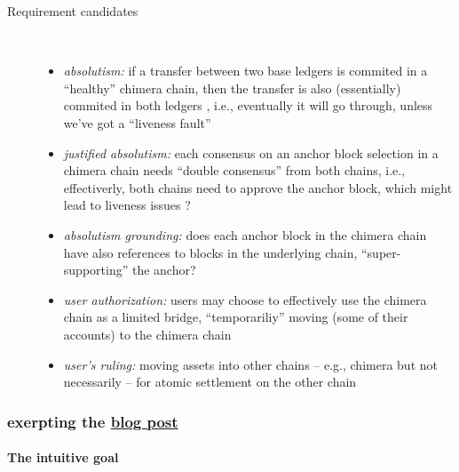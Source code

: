 \documentclass{article}
\theoremstyle{definition}
\begin{document}
\begin{description}
\item[Requirement candidates]~\\
  \begin{itemize}
  \item
    \emph{absolutism:}
    if 
    a transfer between two base ledgers is commited in 
    a “healthy” chimera chain, 
    then the transfer is also (essentially) commited in both ledgers
    ,
    i.e., eventually it will go through, unless we've got a “liveness fault”
  \item 
    \emph{justified absolutism:}
    each consensus on an anchor block selection in 
    a chimera chain needs “double consensus” from both chains,
    i.e., 
    effectiverly,
    both chains need to approve the anchor block,
    which might lead to liveness issues ? 
    
  \item
    \emph{absolutism grounding:}
    does each anchor block in the chimera chain
    have also references to blocks in the underlying chain, 
    “super-supporting” the anchor?

  \item
    \emph{user authorization:}
    users may choose to effectively use
    the chimera chain as a limited bridge,
    “temporariliy” moving (some of their accounts)
    to the chimera chain
  \item
    \emph{user's ruling:}
    moving assets into other chains
    -- e.g., chimera but not necessarily --
    for atomic settlement on the other chain

    
  \end{itemize}
\end{description}


\subsubsection{exerpting the %
  \href{https://anoma.net/blog/heterogeneous-paxos-and-multi-chain-atomic-commits/}{%
    blog post%
  }
}
\label{sec:blog-post-excerpts}

\paragraph{The intuitive goal}
\end{document}
